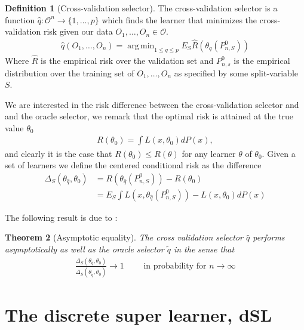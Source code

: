 \documentclass[11pt, a4paper]{article}
\DeclareMathOperator*{\argmin}{arg\,min}
\newtheorem{theorem}{Theorem}
\theoremstyle{definition}
\newtheorem{definition}[theorem]{Definition}
\theoremstyle{remark}
\newcommand{\cl}{q}
\begin{document}
\begin{definition}[Cross-validation selector]
    The cross-validation selector is a function $ \hat{\cl}: \mathcal{O}^{n} \to \{1,\ldots,p\} $  which finds the learner that minimizes the cross-validation risk given our data $ O_1 , \dots , O_n \in \mathcal{O} $. 
    \begin{align*}
        \hat{\cl}(O_1 , \dots , O_n) = \argmin_{1 \leq \cl \leq p} E_S \hat{R} ( \theta _\cl (P_{n,S}^0 )) 
    \end{align*}
    Where $ \hat{R}  $ is the empirical risk over the validation set and $ P_{n ,s}^{0} $ is the empirical distribution over the training set of $ O_1 , \dots , O_n  $ as specified by some split-variable $ S $. 
\end{definition}
We are interested in the risk difference between the cross-validation selector and and the oracle selector, we remark that the optimal risk is attained at the true value $ \theta_0 $ 
\begin{align*}
    R(\theta_0) = \int L(x, \theta_0)  dP(x),
\end{align*}
and clearly it is the case that $ R(\theta_0) \leq R( \theta  ) $ for any learner $ \theta $ of $ \theta_0 $.
Given a set of learners we define the centered conditional risk as the difference 
\begin{align*}
    \Delta_{S}( \theta_{ \hat{\cl} }, \theta_0 ) &= R( \theta _{ \hat{\cl} }(P_{n, S}^{0})) -R(\theta_0) \\
                                                       &= E_{S} \int L(x, \theta_{ \hat{\cl} }(P_{n, S}^{0})) - L(x, \theta_0) dP(x) 
\end{align*}

The following result is due to \cite{laan03}: 
\begin{theorem}[Asymptotic equality]
    The cross validation selector $ \hat{\cl} $ performs asymptotically as well as the oracle selector $ \tilde{\cl} $ in the sense that 
    \begin{align*}
        \frac{\Delta_{S}( \theta_{ \hat{\cl} } , \theta_0 )}{ \Delta_{S}( \theta_{ \tilde{\cl} } , \theta_0) } \to 1 \qquad \text{ in probability for } n \to \infty
    \end{align*}
\end{theorem}


\section{The discrete super learner, dSL}
\end{document}
